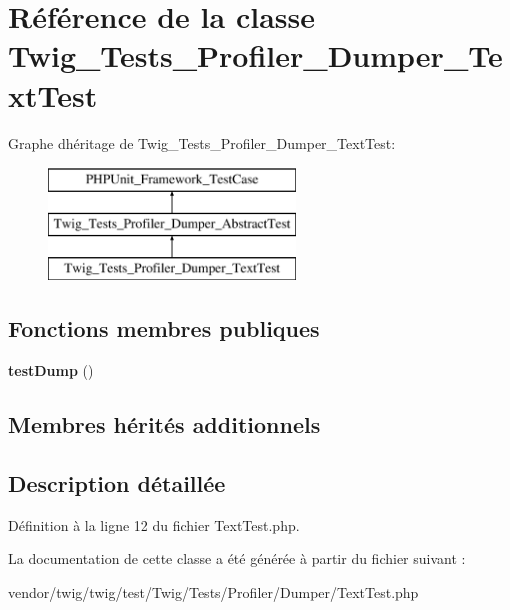 \hypertarget{class_twig___tests___profiler___dumper___text_test}{}\section{Référence de la classe Twig\+\_\+\+Tests\+\_\+\+Profiler\+\_\+\+Dumper\+\_\+\+Text\+Test}
\label{class_twig___tests___profiler___dumper___text_test}
Graphe d\textquotesingle{}héritage de Twig\+\_\+\+Tests\+\_\+\+Profiler\+\_\+\+Dumper\+\_\+\+Text\+Test\+:\begin{figure}[H]
\begin{center}
\leavevmode
\includegraphics[height=3.000000cm]{class_twig___tests___profiler___dumper___text_test}
\end{center}
\end{figure}
\subsection*{Fonctions membres publiques}
\begin{DoxyCompactItemize}
\item 
{\bfseries test\+Dump} ()\hypertarget{class_twig___tests___profiler___dumper___text_test_a054950b93fb5a74a2d2c89d38f5758ff}{}\label{class_twig___tests___profiler___dumper___text_test_a054950b93fb5a74a2d2c89d38f5758ff}

\end{DoxyCompactItemize}
\subsection*{Membres hérités additionnels}


\subsection{Description détaillée}


Définition à la ligne 12 du fichier Text\+Test.\+php.



La documentation de cette classe a été générée à partir du fichier suivant \+:\begin{DoxyCompactItemize}
\item 
vendor/twig/twig/test/\+Twig/\+Tests/\+Profiler/\+Dumper/Text\+Test.\+php\end{DoxyCompactItemize}
